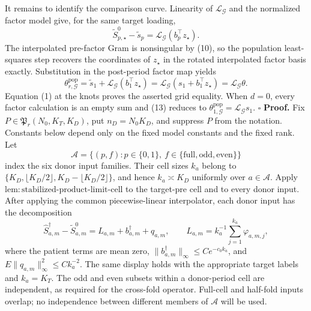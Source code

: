 It remains to identify the comparison curve. Linearity of \(\mathcal L_{\mathcal G}\) and the normalized factor model give, for the same target loading,
\[
 \widetilde S^0_{p,\star}-\widetilde s_p
 =\mathcal L_{\mathcal G}(b_p^\top z_\star). \tag{12}
\]
The interpolated pre-factor Gram is nonsingular by (10), so the population least-squares step recovers the coordinates of \(z_\star\) in the rotated interpolated factor basis exactly. Substitution in the post-period factor map yields
\[
 \theta^{\mathrm{pop}}_{r,\mathcal G}
 =\widetilde s_1+\mathcal L_{\mathcal G}(b_1^\top z_\star)
 =\mathcal L_{\mathcal G}(s_1+b_1^\top z_\star)
 =\mathcal L_{\mathcal G}\theta. \tag{13}
\]
Equation (1) at the knots proves the asserted grid equality. When \(d=0\), every factor calculation is an empty sum and (13) reduces to \(\theta^{\mathrm{pop}}_{1,\mathcal G}=\mathcal L_{\mathcal G}s_1\). \(\square\)
\textbf{Proof.}
Fix \(P\in\mathfrak P_r(N_0,K_T,K_D)\), put
\(n_D=N_0K_D\), and suppress \(P\) from the notation.  Constants below
depend only on the fixed model constants and the fixed rank.  Let
\[
 \mathscr A=\{(p,f):p\in\{0,1\},\
 f\in\{\mathrm{full},\mathrm{odd},\mathrm{even}\}\}
\]
index the six donor input families.  Their cell sizes \(k_a\) belong to
\(\{K_D,\lfloor K_D/2\rfloor,K_D-\lfloor K_D/2\rfloor\}\), and hence
\(k_a\asymp K_D\) uniformly over \(a\in\mathscr A\).  Apply
\(\mathrm{lem:stabilized\mbox{-}product\mbox{-}limit\mbox{-}cell}\) to
the target-pre cell and to every donor input.  After applying the common
piecewise-linear interpolator, each donor input has the decomposition
\[
 \widehat S_{a,m}^{\dagger}-\widetilde S^0_{a,m}
 =L_{a,m}+b_{a,m}^{\dagger}+q_{a,m},
 \qquad
 L_{a,m}=k_a^{-1}\sum_{j=1}^{k_a}\varphi_{a,m,j},       \tag{1}
\]
where the patient terms are mean zero,
\(\|b_{a,m}^{\dagger}\|_\infty\leq Ce^{-c_0k_a}\), and
\(E\|q_{a,m}\|_\infty^2\leq Ck_a^{-2}\).  The same display holds with
the appropriate target labels and \(k_a=K_T\).  The odd and even subsets
within a donor-period cell are independent, as required for the cross-fold
operator.  Full-cell and half-fold inputs overlap; no independence between
different members of \(\mathscr A\) will be used.

